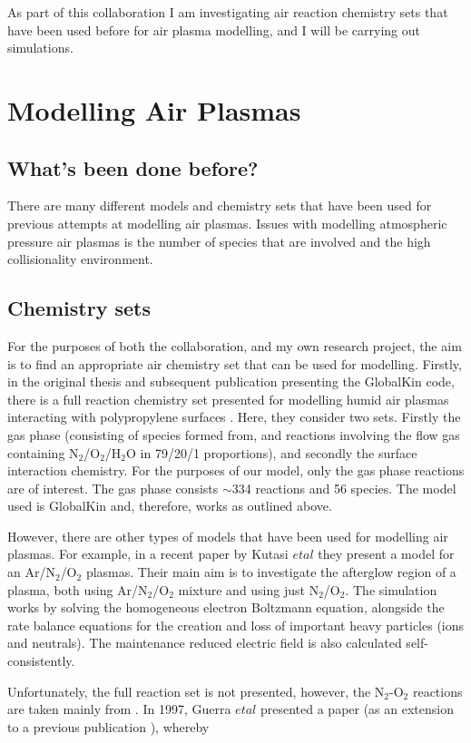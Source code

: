 \documentclass[11pt, oneside]{article}   	%
\begin{document}
As part of this collaboration I am investigating air reaction chemistry sets that have been used before for air plasma modelling, and I will be carrying out simulations.


\section{Modelling Air Plasmas}
\subsection{What's been done before?} 
There are many different models and chemistry sets that have been used for previous attempts at modelling air plasmas. 
Issues with modelling atmospheric pressure air plasmas is the number of species that are involved and the high collisionality environment.
\subsection{Chemistry sets}
For the purposes of both the collaboration, and my own research project, the aim is to find an appropriate air chemistry set that can be used for modelling.
Firstly, in the original thesis and subsequent publication presenting the GlobalKin code, there is a full reaction chemistry set presented for modelling humid air plasmas interacting with polypropylene surfaces \cite{Dorai2002modeling, Dorai2003a}.
Here, they consider two sets.
Firstly the gas phase (consisting of species formed from, and reactions involving the flow gas containing N$_2$/O$_2$/H$_2$O in 79/20/1 proportions), and secondly the surface interaction chemistry. 
For the purposes of our model, only the gas phase reactions are of interest.
The gas phase consists $\sim$334 reactions and 56 species. 
The model used is GlobalKin and, therefore, works as outlined above.

However, there are other types of models that have been used for modelling air plasmas.
For example, in a recent paper by Kutasi $et al$ \cite{Kutasi2016tuning} they present a model for an Ar/N$_2$/O$_2$ plasmas.
Their main aim is to investigate the afterglow region of a plasma, both using Ar/N$_2$/O$_2$ mixture and using just N$_2$/O$_2$.
The simulation works by solving the homogeneous electron Boltzmann equation, alongside the rate balance equations for the creation and loss of important heavy particles (ions and neutrals). 
The maintenance reduced electric field is also calculated self-consistently.

Unfortunately, the full reaction set is not presented, however, the N$_2$-O$_2$ reactions are taken mainly from \cite{Guerra1997self, Pintassilgo2005modelling, Kutasi2008modelling}.
In 1997, Guerra $et al$ \cite{Guerra1997self} presented a paper (as an extension to a previous publication \cite{Guerra1995non}), whereby 
\end{document}
